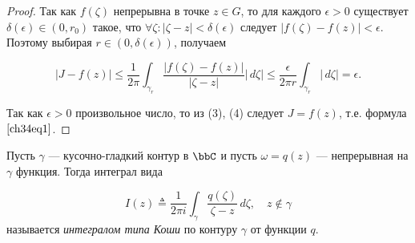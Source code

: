 \begin{proof}
Так как $f(\zeta)$ непрерывна в точке $z \in G$, то для каждого $\epsilon > 0$ существует $\delta(\epsilon) \in (0, r_0)$ такое, что $\forall \zeta : |\zeta - z| < \delta(\epsilon)$ следует $|f(\zeta) - f(z)| < \epsilon$. Поэтому выбирая $r \in (0, \delta(\epsilon))$, получаем

\begin{equation} \label{ch34eq4}
|J - f(z)| \le \frac{1}{2\pi} \int_{\gamma_r} \frac{|f(\zeta) - f(z)|}{|\zeta - z|}|\,d\zeta| \le 
\frac{\epsilon}{2 \pi r} \int_{\gamma_r} |\,d\zeta| = \epsilon.
\end{equation}

Так как $\epsilon > 0$ произвольное число, то из (3), (4) следует $J = f(z)$, т.е. формула $\eqref{ch34eq1}$.
\end{proof}

\begin{defn}\label{ch34defn1}
Пусть $\gamma$ — кусочно-гладкий контур в $\bbC$ и пусть $\omega = q(z)$ — непрерывная на $\gamma$ функция. Тогда интеграл вида

\begin{equation} \label{ch34eq5}
I(z) \triangleq \frac{1}{2 \pi i} \int_\gamma \frac{q(\zeta)}{\zeta - z}\,d\zeta, \quad z \notin \gamma
\end{equation}
называется \textit{интегралом типа Коши} по контуру $\gamma$ от функции $q$.
\end{defn}

